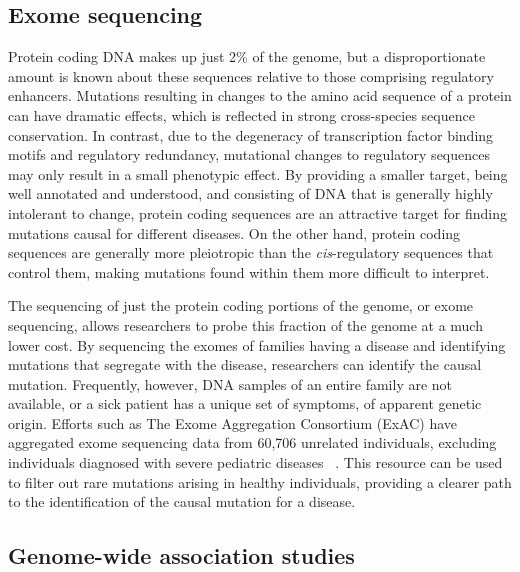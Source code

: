 \subsection{Exome sequencing}

Protein coding DNA makes up just 2\% of the genome, but a disproportionate amount is known about these sequences relative to those comprising regulatory enhancers. Mutations resulting in changes to the amino acid sequence of a protein can have dramatic effects, which is reflected in strong cross-species sequence conservation. In contrast, due to the degeneracy of transcription factor binding motifs and regulatory redundancy, mutational changes to regulatory sequences may only result in a small phenotypic effect. By providing a smaller target, being well annotated and understood, and consisting of DNA that is generally highly intolerant to change, protein coding sequences are an attractive target for finding mutations causal for different diseases. On the other hand, protein coding sequences are generally more pleiotropic than the \emph{cis}-regulatory sequences that control them, making mutations found within them more difficult to interpret.

The sequencing of just the protein coding portions of the genome, or exome sequencing, allows researchers to probe this fraction of the genome at a much lower cost. By sequencing the exomes of families having a disease and identifying mutations that segregate with the disease, researchers can identify the causal mutation. Frequently, however, DNA samples of an entire family are not available, or a sick patient has a unique set of symptoms, of apparent genetic origin. Efforts such as The Exome Aggregation Consortium (ExAC) have aggregated exome sequencing data from 60,706 unrelated individuals, excluding individuals diagnosed with severe pediatric diseases ~\citep{Consortium:2015ib}. This resource can be used to filter out rare mutations arising in healthy individuals, providing a clearer path to the identification of the causal mutation for a disease.

\subsection{Genome-wide association studies}

